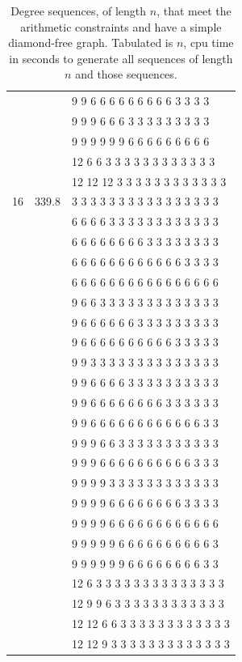 \documentclass{l4proj}
\begin{document}
\begin{table}
\begin{center}
\begin{tiny}
\begin{tabular}{|cc|l|}
   & & 9 9 6 6 6 6 6 6 6 6 6 3 3 3 3 \\
   & & 9 9 9 6 6 6 3 3 3 3 3 3 3 3 3 \\
   & & 9 9 9 9 9 9 6 6 6 6 6 6 6 6 6 \\
   & & 12 6 6 3 3 3 3 3 3 3 3 3 3 3 3 \\
   & & 12 12 12 3 3 3 3 3 3 3 3 3 3 3 3 \\ \hline
16 & 339.8 & 3 3 3 3 3 3 3 3 3 3 3 3 3 3 3 3 \\
   & & 6 6 6 6 3 3 3 3 3 3 3 3 3 3 3 3 \\
   & & 6 6 6 6 6 6 6 6 3 3 3 3 3 3 3 3 \\
   & & 6 6 6 6 6 6 6 6 6 6 6 6 3 3 3 3 \\
   & & 6 6 6 6 6 6 6 6 6 6 6 6 6 6 6 6 \\
   & & 9 6 6 3 3 3 3 3 3 3 3 3 3 3 3 3 \\
   & & 9 6 6 6 6 6 6 3 3 3 3 3 3 3 3 3 \\
   & & 9 6 6 6 6 6 6 6 6 6 6 3 3 3 3 3 \\
   & & 9 9 3 3 3 3 3 3 3 3 3 3 3 3 3 3 \\
   & & 9 9 6 6 6 6 3 3 3 3 3 3 3 3 3 3 \\
   & & 9 9 6 6 6 6 6 6 6 6 3 3 3 3 3 3 \\
   & & 9 9 6 6 6 6 6 6 6 6 6 6 6 6 3 3 \\
   & & 9 9 9 6 6 3 3 3 3 3 3 3 3 3 3 3 \\
   & & 9 9 9 6 6 6 6 6 6 6 6 6 6 3 3 3 \\
   & & 9 9 9 9 3 3 3 3 3 3 3 3 3 3 3 3 \\
   & & 9 9 9 9 6 6 6 6 6 6 6 6 3 3 3 3 \\
   & & 9 9 9 9 6 6 6 6 6 6 6 6 6 6 6 6 \\
   & & 9 9 9 9 9 6 6 6 6 6 6 6 6 6 6 3 \\
   & & 9 9 9 9 9 9 6 6 6 6 6 6 6 6 3 3 \\
   & & 12 6 3 3 3 3 3 3 3 3 3 3 3 3 3 3 \\
   & & 12 9 9 6 3 3 3 3 3 3 3 3 3 3 3 3 \\
   & & 12 12 6 6 3 3 3 3 3 3 3 3 3 3 3 3 \\
   & & 12 12 9 3 3 3 3 3 3 3 3 3 3 3 3 3 \\ \hline
\end{tabular}
\end{tiny}
\end{center}
\caption{Degree sequences, of length $n$, that meet the arithmetic constraints and have a simple diamond-free graph. Tabulated
is $n$, cpu time in seconds to generate all sequences of length $n$ and those sequences.}
\label{tab1}
\end{table}
\end{document}
